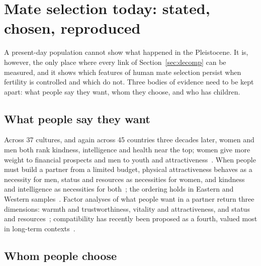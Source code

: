 \section{Mate selection today: stated, chosen, reproduced}\label{sec:today}

\noindent A present-day population cannot show what happened in the Pleistocene. It is, however, the only place where every
link of Section~\ref{sec:decomp} can be measured, and it shows which features of human mate selection persist when fertility
is controlled and which do not. Three bodies of evidence need to be kept apart: what people say they want, whom they choose,
and who has children.

\subsection{What people say they want}

Across 37 cultures, and again across 45 countries three decades later, women and men both rank kindness, intelligence and
health near the top; women give more weight to financial prospects and men to youth and attractiveness~\cite{buss1989,walter2020}.
When people must build a partner from a limited budget, physical attractiveness behaves as a necessity for men, status and
resources as necessities for women, and kindness and intelligence as necessities for both~\cite{li2002}; the ordering holds in
Eastern and Western samples~\cite{thomas2020}. Factor analyses of what people want in a partner return three dimensions:
warmth and trustworthiness, vitality and attractiveness, and status and resources~\cite{fletcher1999}; compatibility has
recently been proposed as a fourth, valued most in long-term contexts~\cite{jonason2026}.

\subsection{Whom people choose}

